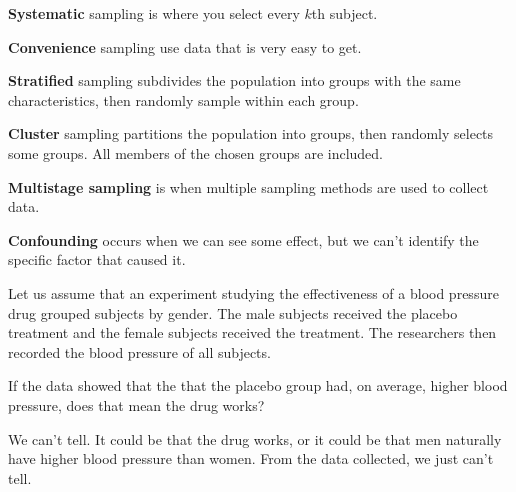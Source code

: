 \documentclass{beamer}
\begin{document}
\begin{frame}
\begin{definition}
\textbf{Systematic} sampling is where you select every $k$th subject.
\end{definition}\pause

\begin{definition}
\textbf{Convenience} sampling use data that is very easy to get.
\end{definition}\pause

\begin{definition}
\textbf{Stratified} sampling subdivides the population into groups with the same characteristics, then randomly sample within each group.
\end{definition}\pause

\begin{definition}
\textbf{Cluster} sampling partitions the population into groups, then randomly selects some groups. All members of the chosen groups are included.
\end{definition}\pause

\begin{definition}
\textbf{Multistage sampling} is when multiple sampling methods are used to collect data.
\end{definition}
\end{frame}

\begin{frame}
\begin{definition}
\textbf{Confounding} occurs when we can see some effect, but we can't identify the specific factor that caused it.
\end{definition}\pause

\begin{example}
Let us assume that an experiment studying the effectiveness of a blood pressure drug grouped subjects by gender. The male subjects received the placebo treatment and the female subjects received the treatment. The researchers then recorded the blood pressure of all subjects.\pause

\vspace{3mm}
If the data showed that the that the placebo group had, on average, higher blood pressure, does that mean the drug works?\pause

\vspace{3mm}
We can't tell. It could be that the drug works, or it could be that men naturally have higher blood pressure than women. From the data collected, we just can't tell.
\end{example}
\end{frame}
\end{document}
